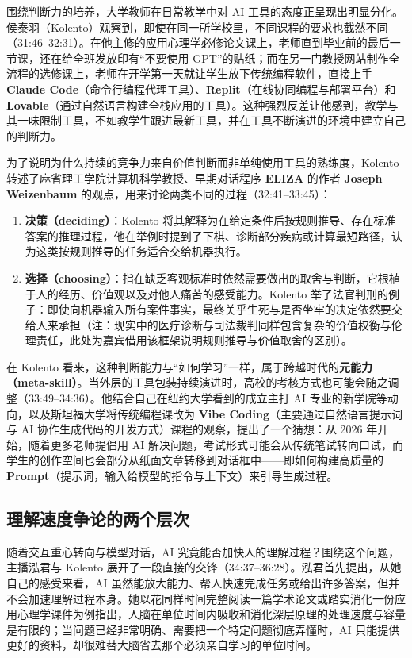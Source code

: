 \documentclass[UTF8,a4paper,11pt,fontset=fandol]{ctexart}
\begin{document}
围绕判断力的培养，大学教师在日常教学中对 AI 工具的态度正呈现出明显分化。侯泰羽（Kolento）观察到，即使在同一所学校里，不同课程的要求也截然不同（31:46–32:31）。在他主修的应用心理学必修论文课上，老师直到毕业前的最后一节课，还在给全班发放印有“不要使用 GPT”的贴纸；而在另一门教授网站制作全流程的选修课上，老师在开学第一天就让学生放下传统编程软件，直接上手 \textbf{Claude Code}（命令行编程代理工具）、\textbf{Replit}（在线协同编程与部署平台）和 \textbf{Lovable}（通过自然语言构建全栈应用的工具）。这种强烈反差让他感到，教学与其一味限制工具，不如教学生跟进最新工具，并在工具不断演进的环境中建立自己的判断力。

为了说明为什么持续的竞争力来自价值判断而非单纯使用工具的熟练度，Kolento 转述了麻省理工学院计算机科学教授、早期对话程序 \textbf{ELIZA} 的作者 \textbf{Joseph Weizenbaum} 的观点，用来讨论两类不同的过程（32:41–33:45）：

\begin{enumerate}
\item \textbf{决策（deciding）}：Kolento 将其解释为在给定条件后按规则推导、存在标准答案的推理过程，他在举例时提到了下棋、诊断部分疾病或计算最短路径，认为这类按规则推导的任务适合交给机器执行。
\item \textbf{选择（choosing）}：指在缺乏客观标准时依然需要做出的取舍与判断，它根植于人的经历、价值观以及对他人痛苦的感受能力。Kolento 举了法官判刑的例子：即使向机器输入所有案件事实，最终关乎生死与是否坐牢的决定依然要交给人来承担（注：现实中的医疗诊断与司法裁判同样包含复杂的价值权衡与伦理责任，此处为嘉宾借用该框架说明规则推导与价值取舍的区别）。
\end{enumerate}

在 Kolento 看来，这种判断能力与“如何学习”一样，属于跨越时代的\textbf{元能力（meta-skill）}。当外层的工具包装持续演进时，高校的考核方式也可能会随之调整（33:49–34:36）。他结合自己在纽约大学看到的成立主打 AI 专业的新学院等动向，以及斯坦福大学将传统编程课改为 \textbf{Vibe Coding}（主要通过自然语言提示词与 AI 协作生成代码的开发方式）课程的观察，提出了一个猜想：从 2026 年开始，随着更多老师提倡用 AI 解决问题，考试形式可能会从传统笔试转向口试，而学生的创作空间也会部分从纸面文章转移到对话框中——即如何构建高质量的 \textbf{Prompt}（提示词，输入给模型的指令与上下文）来引导生成过程。

\subsection{理解速度争论的两个层次}
随着交互重心转向与模型对话，AI 究竟能否加快人的理解过程？围绕这个问题，主播泓君与 Kolento 展开了一段直接的交锋（34:37–36:28）。泓君首先提出，从她自己的感受来看，AI 虽然能放大能力、帮人快速完成任务或给出许多答案，但并不会加速理解过程本身。她以花同样时间完整阅读一篇学术论文或踏实消化一份应用心理学课件为例指出，人脑在单位时间内吸收和消化深层原理的处理速度与容量是有限的；当问题已经非常明确、需要把一个特定问题彻底弄懂时，AI 只能提供更好的资料，却很难替大脑省去那个必须亲自学习的单位时间。
\end{document}
